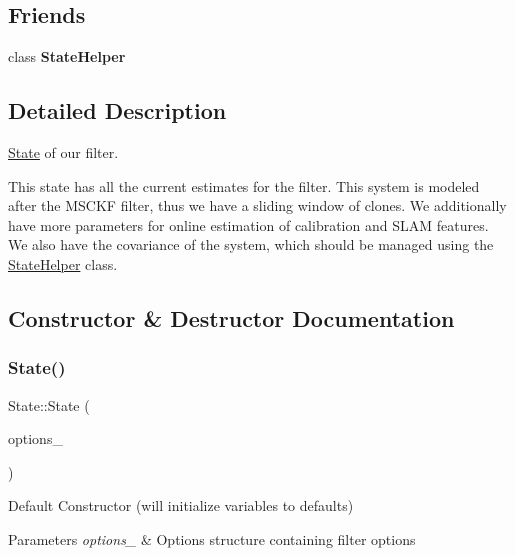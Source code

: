 \subsection*{Friends}
\begin{DoxyCompactItemize}
\item 
\mbox{\label{classov__msckf_1_1State_abaf77b0c719a76ee0fd7282a087577da}} 
class {\bfseries State\+Helper}
\end{DoxyCompactItemize}


\subsection{Detailed Description}
\hyperlink{classov__msckf_1_1State}{State} of our filter. 

This state has all the current estimates for the filter. This system is modeled after the M\+S\+C\+KF filter, thus we have a sliding window of clones. We additionally have more parameters for online estimation of calibration and S\+L\+AM features. We also have the covariance of the system, which should be managed using the \hyperlink{classov__msckf_1_1StateHelper}{State\+Helper} class. 

\subsection{Constructor \& Destructor Documentation}
\mbox{\label{classov__msckf_1_1State_ad6098accfeb57e7eb8c8a22bfd45ec0b}} 
\subsubsection{\texorpdfstring{State()}{State()}}
{\footnotesize\ttfamily State\+::\+State (\begin{DoxyParamCaption}\item[{\hyperlink{structov__msckf_1_1StateOptions}{State\+Options} \&}]{options\+\_\+ }\end{DoxyParamCaption})}



Default Constructor (will initialize variables to defaults) 


\begin{DoxyParams}{Parameters}
{\em options\+\_\+} & Options structure containing filter options \\
\hline
\end{DoxyParams}


